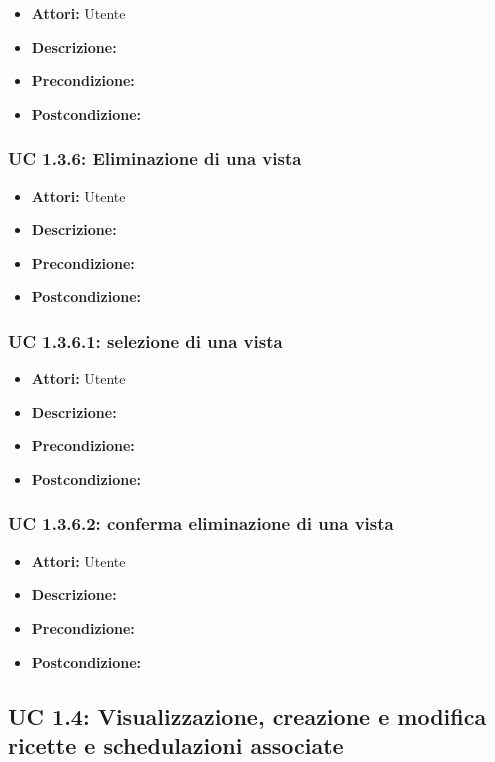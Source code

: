 \begin{itemize}
\item \textbf{Attori:} Utente
\item \textbf{Descrizione:} 
\item \textbf{Precondizione:} 
\item \textbf{Postcondizione:} 
\end{itemize}

\subsubsection{UC 1.3.6: Eliminazione di una vista}

\begin{itemize}
\item \textbf{Attori:} Utente
\item \textbf{Descrizione:} 
\item \textbf{Precondizione:} 
\item \textbf{Postcondizione:} 
\end{itemize}

\subsubsection{UC 1.3.6.1: selezione di una vista}

\begin{itemize}
\item \textbf{Attori:} Utente
\item \textbf{Descrizione:} 
\item \textbf{Precondizione:} 
\item \textbf{Postcondizione:} 
\end{itemize}

\subsubsection{UC 1.3.6.2: conferma eliminazione di una vista}

\begin{itemize}
\item \textbf{Attori:} Utente
\item \textbf{Descrizione:} 
\item \textbf{Precondizione:} 
\item \textbf{Postcondizione:} 
\end{itemize}



\subsection{UC 1.4: Visualizzazione, creazione e modifica ricette e schedulazioni associate}

